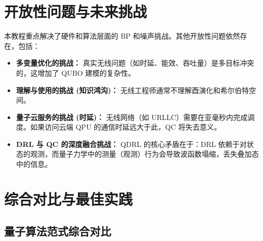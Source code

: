 \documentclass[11pt,a4paper]{article}
\begin{document}
\section{开放性问题与未来挑战}

本教程重点解决了硬件和算法层面的 BP 和噪声挑战。其他开放性问题依然存在，包括：

\begin{itemize}
\item \textbf{多变量优化的挑战：} 真实无线问题（如时延、能效、吞吐量）是多目标冲突的，这增加了 QUBO 建模的复杂性。

\item \textbf{理解与使用的挑战 (知识鸿沟)：} 无线工程师通常不理解酉演化和希尔伯特空间。

\item \textbf{量子云服务的挑战 (时延)：} 无线网络（如 URLLC）需要在亚毫秒内完成调度。如果访问云端 QPU 的通信时延远大于此，QC 将失去意义。

\item \textbf{DRL 与 QC 的深度融合挑战：} QDRL 的核心矛盾在于：DRL 依赖于对状态的观测，而量子力学中的测量（观测）行为会导致波函数塌缩，丢失叠加态中的信息。
\end{itemize}

\section{综合对比与最佳实践}

\subsection{量子算法范式综合对比}
\end{document}

